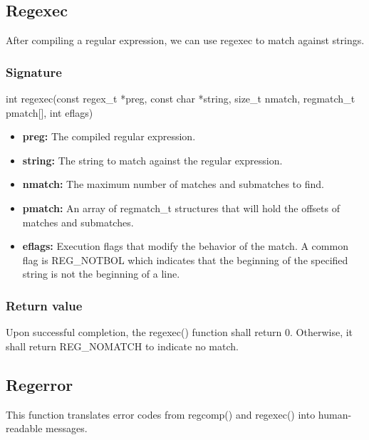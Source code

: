 \documentclass{report}
\begin{document}
    \bigbreak \noindent 
    \subsection{Regexec}
    \bigbreak \noindent 
    \begin{concept}
        After compiling a regular expression, we can use regexec to match against strings.
    \end{concept}
    \bigbreak \noindent 
    \subsubsection{Signature}
    \bigbreak \noindent 
    \begin{cppcode}
         int regexec(const regex\_t *preg, const char *string, size\_t nmatch, regmatch\_t pmatch[], int eflags)
    \end{cppcode}
    \bigbreak \noindent 
    \begin{itemize}
        \item \textbf{preg:} The compiled regular expression.
        \item \textbf{string:} The string to match against the regular expression.
        \item \textbf{nmatch:} The maximum number of matches and submatches to find.
        \item \textbf{pmatch:} An array of regmatch\_t structures that will hold the offsets of matches and submatches.
        \item \textbf{eflags:} Execution flags that modify the behavior of the match. A common flag is REG\_NOTBOL which indicates that the beginning of the specified string is not the beginning of a line.
    \end{itemize}

    \bigbreak \noindent 
    \subsubsection{Return value}
    \bigbreak \noindent 
    Upon successful completion, the regexec() function shall return 0. Otherwise, it shall return REG\_NOMATCH to indicate no match.

    \bigbreak \noindent 
    \subsection{Regerror}
    \bigbreak \noindent 
    \begin{concept}
        This function translates error codes from regcomp() and regexec() into human-readable messages.
    \end{concept}
    \bigbreak \noindent 
\end{document}
